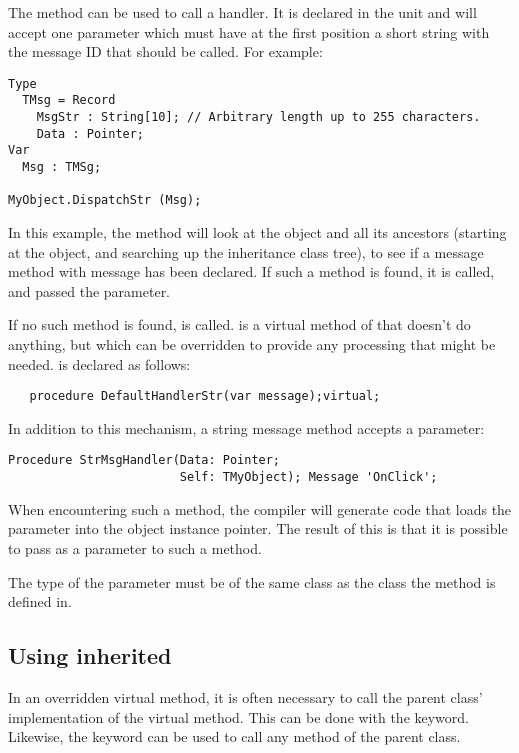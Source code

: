 The   method can be used to call a 
handler. It is declared in the  unit and will accept one parameter
which must have at the first position a short string with the message ID that
should be called. For example:
\begin{verbatim}
Type
  TMsg = Record
    MsgStr : String[10]; // Arbitrary length up to 255 characters.
    Data : Pointer;
Var
  Msg : TMSg;

MyObject.DispatchStr (Msg);
\end{verbatim}
In this example, the  method will look at the object and
all its ancestors (starting at the object, and searching up the inheritance 
class tree), to see if a message method with message  has been
declared. If such a method is found, it is called, and passed the
 parameter.

If no such method is found,  is called.
 is a virtual method of  that doesn't do
anything, but which can be overridden to provide any processing that might be
needed.  is declared as follows:
\begin{verbatim}
   procedure DefaultHandlerStr(var message);virtual;
\end{verbatim}
In addition to this mechanism, a string message method accepts a 
parameter:
\begin{verbatim}
Procedure StrMsgHandler(Data: Pointer; 
                        Self: TMyObject); Message 'OnClick';
\end{verbatim}
When encountering such a method, the compiler will generate code that loads
the  parameter into the object instance pointer. The result of
this is that it is possible to pass  as a parameter to such a
method.

\begin{remark}
The type of the  parameter must be of the same class
as the class the method is defined in.
\end{remark}

\subsection{Using inherited}
In an overridden virtual method, it is often necessary to call the parent
class' implementation of the virtual method. This can be  done with the
 keyword. Likewise, the  keyword can be used
to call any method of the parent class.

